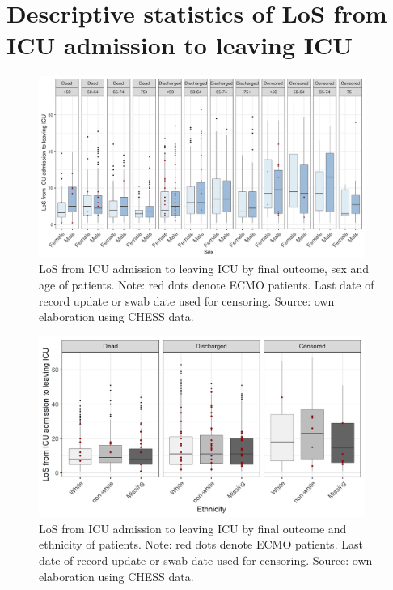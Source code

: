 \documentclass[review]{elsarticle}
\begin{document}
\newpage


\section{Descriptive statistics of LoS from ICU admission to leaving ICU} 

\begin{figure}[!ht]
    \centering
    \includegraphics[width=0.95\textwidth]{LOS_descr_ASO.png}
    \caption{LoS from ICU admission to leaving ICU  by final outcome, sex and age of patients. Note: red dots denote ECMO patients. Last date of record update or swab date used for censoring. Source: own elaboration using CHESS data.}
    \label{Figure:los_desc_aso}
\end{figure}
\begin{figure}[!hb]
    \centering
    \includegraphics[width=0.95\textwidth]{LOS_descr_EthO.png}
    \caption{LoS from ICU admission to leaving ICU  by final outcome  and ethnicity of patients. Note: red dots denote ECMO patients. Last date of record update or swab date used for censoring. Source: own elaboration using CHESS data.}
    \label{Figure:los_desc_eth}
\end{figure}
\end{document}
